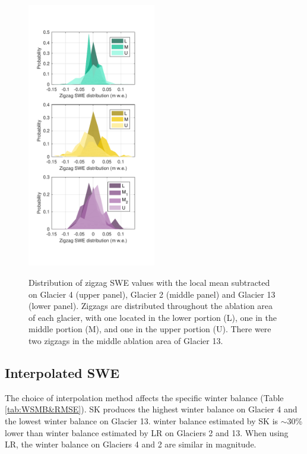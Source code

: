 \documentclass[review,oneside, letterpaper]{igs}
\begin{document}
\begin{figure}
	\centering
	\includegraphics[width =0.5\textwidth]{ZigzagHistogram.pdf}\\
	\caption{Distribution of zigzag SWE values with the local mean subtracted on Glacier 4 (upper panel), Glacier 2 (middle panel) and Glacier 13 (lower panel). Zigzags are distributed throughout the ablation area of each glacier, with one located in the lower portion (L), one in the middle portion (M), and one in the upper portion (U). There were two zigzags in the middle ablation area of Glacier 13.}
	\label{fig:ZigzagHistogram}
\end{figure}

\subsection{Interpolated SWE}
 
The choice of interpolation method affects the specific winter balance (Table \ref{tab:WSMB&RMSE}). SK produces the highest winter balance on Glacier 4 and the lowest winter balance on Glacier 13. winter balance estimated by SK is $\sim$30\% lower than winter balance estimated by LR on Glaciers 2 and 13. When using LR, the winter balance on Glaciers 4 and 2 are similar in magnitude.
\end{document}
